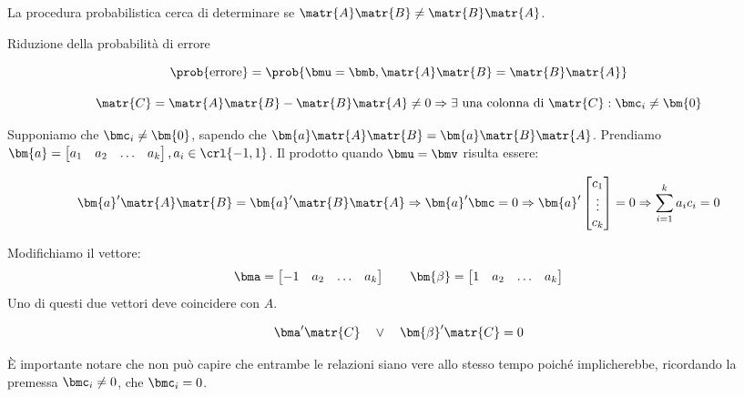 \documentclass[\main/main.tex]{subfiles}
\begin{document}
La procedura probabilistica cerca di determinare se \(\matr{A}\matr{B} \neq \matr{B}\matr{A}\).


\IncMargin{1em}
\begin{algorithm}
	\BlankLine
	\caption{Riduzione della probabilità di errore}
\end{algorithm}\DecMargin{1em}

\[\prob{\text{errore}} = \prob{\bmu=\bmb, \matr{A}\matr{B} = \matr{B}\matr{A}}\]

\[
	\matr{C} = \matr{A}\matr{B} - \matr{B}\matr{A} \neq 0 \Rightarrow \exists \text{ una colonna di } \matr{C}: \bmc_i \neq \bm{0}
\]

Supponiamo che \(\bmc_i \neq \bm{0}\), sapendo che \(\bm{a}\matr{A}\matr{B} = \bm{a}\matr{B}\matr{A}\). Prendiamo \(\bm{a} = \begin{bmatrix}
	a_1 & a_2 & \ldots & a_k
\end{bmatrix}, a_i \in \crl{-1, 1}\). Il prodotto quando \(\bmu = \bmv \) risulta essere:

\[
	\bm{a}'\matr{A}\matr{B} = \bm{a}'\matr{B}\matr{A} \Rightarrow \bm{a}'\bmc = 0 \Rightarrow \bm{a}' \begin{bmatrix}
		c_1    \\
		\vdots \\
		c_k
	\end{bmatrix} = 0 \Rightarrow \sum_{i=1}^k a_i c_i = 0
\]

Modifichiamo il vettore:
\[
	\bma = \begin{bmatrix}
		-1 & a_2 & \ldots & a_k
	\end{bmatrix}
	\qquad
	\bm{\beta} = \begin{bmatrix}
		1 & a_2 & \ldots & a_k
	\end{bmatrix}
\]
Uno di questi due vettori deve coincidere con \(A\).

\[
	\bma' \matr{C} \quad \lor \quad \bm{\beta}'\matr{C} = 0
\]

È importante notare che non può capire che entrambe le relazioni siano vere allo stesso tempo poiché implicherebbe, ricordando la premessa \(\bmc_i \neq 0\), che \(\bmc_i = 0\).
\end{document}
